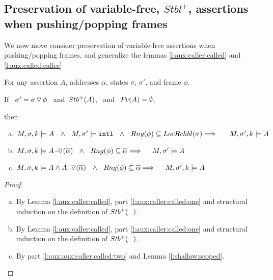 \subsection{Preservation of variable-free, $Stbl^+$, assertions when   pushing/popping frames}
We now move consider preservation of variable-free assertions when pushing/popping frames, and generalize the lemmas  \ref{l:aux:caller:called} and
 \ref{l:aux:called:caller}

\begin{lemma}
\label{l:aux:aux:caller:called}

For any assertion $A$,  addresses $\overline \alpha$, states $\sigma$, $\sigma'$,  and frame $\phi$.

\noindent
If \   $\sigma'=\sigma  \, {\triangledown}\, \phi $ \  and\  ${Stb^+( A )}$, \ and \  ${\hspace{-1pt}F\hspace{-1pt}}v(A)=\emptyset$,

\noindent
then

\begin{enumerate}[a.]

\item
\label{l:aux:aux:caller:called:one}
$ \satDAssertFrom M  \sigma k    A \ \ \wedge \ \  
  M, \sigma' \models \intThis\ \ \wedge \ \  Rng(\phi) \subseteq  \LRelevantO \sigma
  \hfill \Longrightarrow  \ \ \  \   \ \satDAssertFrom M  {\sigma'} k   A $

\item
\label{l:aux:aux:caller:called:two}
$\satDAssertFrom M  \sigma k    {\PushASLong  {(\overline {\alpha})} {A}}    \ \ \wedge \ \  Rng(\phi) \subseteq   {\overline \alpha}  
 \hfill \Longrightarrow  \ \ \  \    M,  {\sigma'} \models   {A}$

\item
\label{l:aux:aux:caller:called:three}
$\satDAssertFrom M  \sigma k    {A \wedge   {\PushASLong  {(\overline {\alpha})} {A}} }    \ \ \wedge \ \  Rng(\phi) \subseteq    {\overline \alpha} 
 \hfill \Longrightarrow  \ \ \  \   \satDAssertFrom M  {\sigma'} k  {A}$

\end{enumerate}

\end{lemma}

\begin{proof} $ ~ $ %

\begin{enumerate}[a.]
 
\item
By Lemma \ref{l:aux:caller:called}, part \ref{l:aux:caller:called:one}  and structural induction on the definition of ${Stb^+( \_ )}$.
\item
By Lemma \ref{l:aux:caller:called}, part \ref{l:aux:caller:called:one}  and structural induction on the definition of ${Stb^+( \_ )}$.
\item 
By part   \ref{l:aux:aux:caller:called:two} and Lemma  \ref{l:shallow:scoped}.
\end{enumerate}
 
\end{proof}


